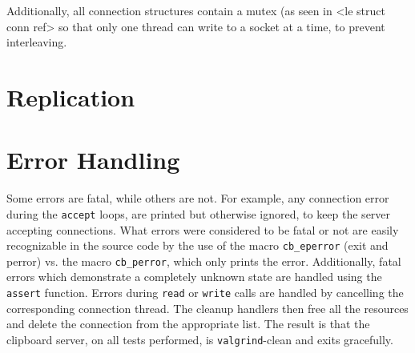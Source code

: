 \documentclass[a4paper, titlepage, english]{article}
\begin{document}
	\par
	Additionally, all connection structures contain a mutex (as seen in <le struct conn ref> so that only one thread can write to a socket at a time, to prevent interleaving.

	\section{Replication}

	\section{Error Handling}
	\par
	Some errors are fatal, while others are not. For example, any connection error during the \texttt{accept} loops, are printed but otherwise ignored, to keep the server accepting connections. What errors were considered to be fatal or not are easily recognizable in the source code by the use of the macro \texttt{cb\_eperror} (exit and perror) vs. the macro \texttt{cb\_perror}, which only prints the error. Additionally, fatal errors which demonstrate a completely unknown state are handled using the \texttt{assert} function. Errors during \texttt{read} or \texttt{write} calls are handled by cancelling the corresponding connection thread. The cleanup handlers then free all the resources and delete the connection from the appropriate list. The result is that the clipboard server, on all tests performed, is \texttt{valgrind}-clean and exits gracefully.



\end{document}
